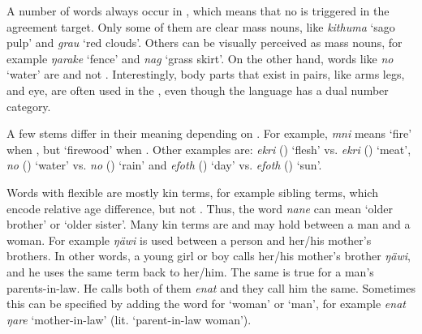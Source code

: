 A number of words always occur in , which means that no  is triggered in the agreement target. Only some of them are clear mass nouns, like \emph{kithuma} `sago pulp' and \emph{grau} `red clouds'. Others can be visually perceived as mass nouns, for example \emph{ŋarake} `fence' and \emph{nag} `grass skirt'. On the other hand, words like \emph{no} `water' are  and not . Interestingly, body parts that exist in pairs, like arms legs, and eye, are often used in the , even though the language has a dual number category.

A few stems differ in their meaning depending on . For example, \emph{mni} means `fire' when , but `firewood' when . Other examples are: \emph{ekri} (\F) `flesh' vs. \emph{ekri} (\Masc) `meat', \emph{no} (\F) `water' vs. \emph{no}  (\Masc) `rain' and \emph{efoth} (\F) `day' vs. \emph{efoth} (\Masc) `sun'.

Words with flexible  are mostly kin terms, for example sibling terms, which encode relative age difference, but not . Thus, the word \emph{nane} can mean `older brother' or `older sister'. Many kin terms are  and may hold between a man and a woman. For example \emph{ŋäwi} is used between a person and her/his mother's brothers. In other words, a young girl or boy calls her/his mother's brother \emph{ŋäwi}, and he uses the same term back to her/him. The same is true for a man's parents-in-law. He calls both of them \emph{enat} and they call him the same. Sometimes this can be specified by adding the word for `woman' or `man', for example \emph{enat ŋare} `mother-in-law' (lit. `parent-in-law woman').


